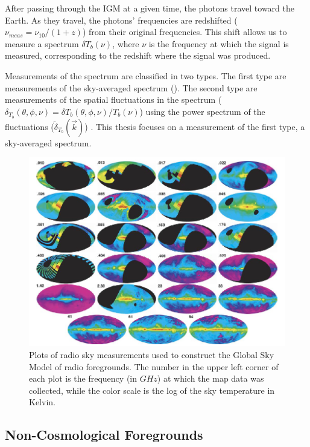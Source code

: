 After passing through the IGM at a given time, the \cm photons travel toward the Earth. As they travel, the photons' frequencies are redshifted ($\nu_{meas} = \nu_{10}/(1+z)$) from their original frequencies. This shift allows us to measure a spectrum $\delta T_b (\nu)$, where $\nu$ is the frequency at which the signal is measured, corresponding to the redshift where the signal was produced. 

Measurements of the \cm spectrum are classified in two types. The first type are measurements of the sky-averaged spectrum (\avgdtb). The second type are measurements of the spatial fluctuations in the \cm spectrum ($\delta_{T_b} (\theta, \phi, \nu) =  \delta T_b (\theta, \phi, \nu)/ T_b (\nu)$) using the power spectrum of the fluctuations ($ \tilde{\delta}_{T_b} ( \vec{k} )$) \cite{natarajan_2014}. This thesis focuses on a measurement of the first type, a sky-averaged spectrum. 

\begin{figure}[htb]
\begin{center}
\includegraphics[width=0.95\linewidth]{Introduction/figures/GSM_maps.jpg}
\caption{Plots of radio sky measurements used to construct the Global Sky Model \cite{GSM_model} of radio foregrounds. The number in the upper left corner of each plot is the frequency (in $GHz$) at which the map data was collected, while the color scale is the log of the sky temperature in Kelvin.}
\label{Fig:GSM_maps}
\end{center}
\end{figure}


\subsection{Non-Cosmological Foregrounds} \label{Sec:gsm_fore}

